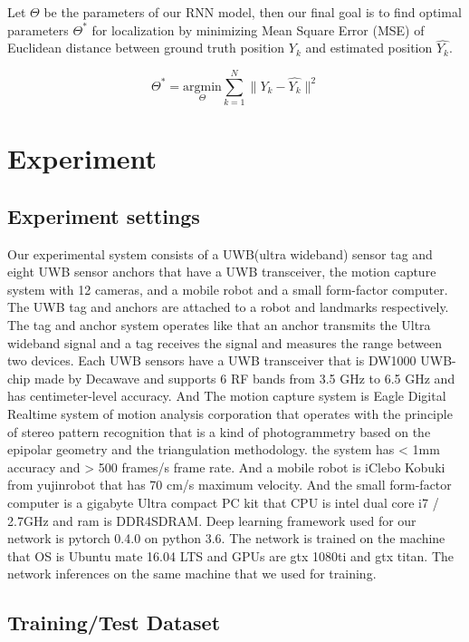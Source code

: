 \documentclass[letterpaper, 10 pt, conference]{ieeeconf}  %
\begin{document}
Let $\Theta$ be the parameters of our RNN model, then our final goal is to find optimal parameters $\Theta^{*}$ for localization by minimizing Mean Square Error (MSE) of Euclidean distance between ground truth position $Y_k$ and estimated position $\hat{Y_k}$.

\begin{equation}
\Theta^{*} = \underset{\Theta}{\mathrm{argmin}} \sum_{k=1}^N \parallel Y_k - \hat{Y_k} \parallel^{2}
\end{equation}  


\section{Experiment}


\subsection{Experiment settings} 

Our experimental system consists of a UWB(ultra wideband) sensor tag and eight UWB sensor anchors that have a UWB transceiver, the motion capture system with 12 cameras, and a mobile robot and a small form-factor computer. The UWB tag and anchors are attached to a robot and landmarks respectively. The tag and anchor system operates like that an anchor transmits the Ultra wideband signal and a tag receives the signal and measures the range between two devices. Each UWB sensors have a UWB transceiver that is DW1000 UWB-chip made by Decawave and supports 6 RF bands from 3.5 GHz to 6.5 GHz and has centimeter-level accuracy. And The motion capture system is Eagle Digital Realtime system of motion analysis corporation that operates with the principle of stereo pattern recognition that is a kind of photogrammetry based on the epipolar geometry and the triangulation methodology. the system has < 1mm accuracy and > 500 frames/s frame rate. And a mobile robot is iClebo Kobuki from yujinrobot that has 70 cm/s maximum velocity. And the small form-factor computer is a gigabyte Ultra compact PC kit that CPU is intel dual core i7 / 2.7GHz and ram is DDR4SDRAM.
Deep learning framework used for our network is pytorch 0.4.0 on python 3.6. The network is trained on the machine that OS is Ubuntu mate 16.04 LTS and GPUs are gtx 1080ti and gtx titan. The network inferences on the same machine that we used for training.

\subsection{Training/Test Dataset}
\end{document}
